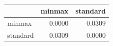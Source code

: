 \begin{tabular}{lrr}
\toprule
 & minmax & standard \\
\midrule
minmax & 0.0000 & 0.0309 \\
standard & 0.0309 & 0.0000 \\
\bottomrule
\end{tabular}
